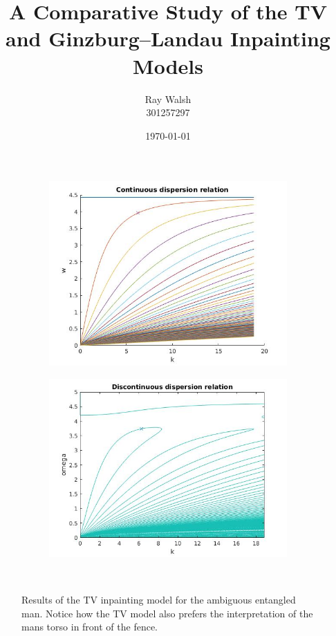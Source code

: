 \documentclass[12pt]{article}
\begin{document}
\title{A Comparative Study of the TV and Ginzburg--Landau Inpainting Models}
\date{\today}
\author{Ray Walsh\\
301257297}

\begin{figure}[tb!]
  \centering
  \begin{subfigure}{.5\linewidth}
    \centering
    \includegraphics[width=\linewidth]{CDRel.jpg}
    \caption{}
    \label{fig:WideCross}
  \end{subfigure}%
  \begin{subfigure}{.5\linewidth}
    \centering
    \includegraphics[width=\linewidth]{DDRel.jpg}
    \caption{}
    \label{fig:InpaintedWideCross}
  \end{subfigure}\\[1ex]
  \caption{Results of the TV inpainting model for the ambiguous entangled man. Notice how the TV model also prefers the interpretation of the mans torso in front of the fence.}
  \label{fig:TVWideCross}
\end{figure}
\end{document}
